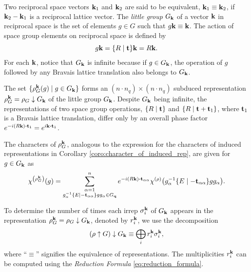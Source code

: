 
\begin{definition}
Two reciprocal space vectors ${\vb{k}}_1$ and ${\vb{k}}_2$ are said to be equivalent, ${\vb{k}}_1 \equiv {\vb{k}}_2$, if ${\vb{k}}_2 - {\vb{k}}_1$ is a reciprocal lattice vector. The \textit{little group} $G_{\vb{k}}$ of a vector ${\vb{k}}$ in reciprocal space is the set of elements $g \in G$ such that $g {\vb{k}} \equiv {\vb{k}}$. The action of space group elements on reciprocal space is defined by
$$
g{\vb{k}} = \{ R \mid {\vb{t}} \}{\vb{k}} = R{\vb{k}}.
$$
For each ${\vb{k}}$, notice that $G_{\vb{k}}$ is infinite because if $g \in G_{\vb{k}}$, the operation of $g$ followed by any Bravais lattice translation also belongs to $G_{\vb{k}}$.
\end{definition}

\n

The set \(\{\rho_G^{\vb{k}}(g) \mid g \in G_{\vb{k}}\}\) forms an \((n \cdot n_q) \times (n \cdot n_q)\) subduced representation \(\rho_G^{\vb{k}} = \rho_G \downarrow G_{\vb{k}}\) of the little group \(G_{\vb{k}}\). Despite \(G_{\vb{k}}\) being infinite, the representations of two space group operations, \(\{ R \mid {\vb{t}} \}\) and \(\{ R \mid {\vb{t}} + {\vb{t}}_1 \}\), where \({\vb{t}}_1\) is a Bravais lattice translation, differ only by an overall phase factor \(e^{-i(R\k) \vdot \t_1} = e^{i\k \vdot \t_1}\).

The characters of \( \rho_G^{\vb{k}} \), analogous to the expression for the characters of induced representations in Corollary \ref{coro:character_of_induced_rep}, are given for \( g \in G_{\vb{k}} \) as
\begin{equation} \label{eq:}
\chi^{\qty(\rho_G^\k)}(g) =
\sum_{\substack{\alpha=1 \\ g_\alpha^{-1}\sg{E}{-\t_{\alpha\alpha}}g g_\alpha \in G_\q}}^n e^{-i(R\k)\vdot\t_{\alpha\alpha}}
\chi^{(\rho)}\qty(g_\alpha^{-1}\sg{E}{-\t_{\alpha\alpha}}g g_\alpha).
\end{equation}

To determine the number of times each irrep \(\sigma_i^{\vb{k}}\) of \(G_{\vb{k}}\) appears in the representation \(\rho_G^{\vb{k}} = \rho_G \downarrow G_{\vb{k}}\), denoted by \(r_i^{\vb{k}}\), we use the decomposition
\begin{equation} \label{eq:induce_subduce}
(\rho \uparrow G) \downarrow G_{\vb{k}} \equiv \bigoplus_i r_i^{\vb{k}} \sigma_i^{\vb{k}},
\end{equation}
where ``\(\equiv\)'' signifies the equivalence of representations. The multiplicities \(r_i^{\vb{k}}\) can be computed using the \textit{Reduction Formula} \ref{eq:reduction_formula}.

